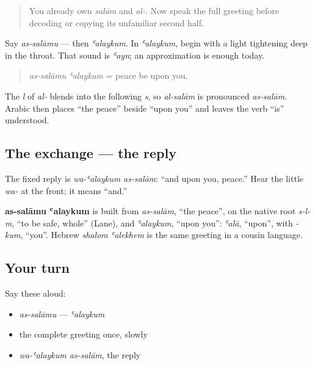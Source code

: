 \label{lesson:AR-C01-as-salamu-alaykum}



\begin{quote}
You already own \emph{salām} and \emph{al-}. Now speak the full greeting before decoding or copying its unfamiliar second half.
\end{quote}

\begin{sounds}
Say \emph{as-salāmu} — then \emph{ʿalaykum}. In \emph{ʿalaykum}, begin with a light tightening deep in the throat. That sound is \emph{ʿayn}; an approximation is enough today.

\begin{quote}
\emph{as-salāmu ʿalaykum} = peace be upon you.
\end{quote}

The \emph{l} of \emph{al-} blends into the following \emph{s}, so \emph{al-salām} is pronounced \emph{as-salām}. Arabic then places “the peace” beside “upon you” and leaves the verb “is” understood.
\end{sounds}

\subsection*{The exchange — the reply}
The fixed reply is \emph{wa-ʿalaykum as-salām}: “and upon you, peace.” Hear the little \emph{wa-} at the front; it means “and.”

\begin{cousinweb}
\textbf{as-salāmu ʿalaykum} is built from \emph{as-salām}, \textquotedblleft{}the peace\textquotedblright{}, on the native root \emph{s-l-m}, \textquotedblleft{}to be safe, whole\textquotedblright{} (Lane), and \emph{ʿalaykum}, \textquotedblleft{}upon you\textquotedblright{}: \emph{ʿalā}, \textquotedblleft{}upon\textquotedblright{}, with \emph{-kum}, \textquotedblleft{}you\textquotedblright{}. Hebrew \emph{shalom ʿalekhem} is the same greeting in a cousin language.
\end{cousinweb}

\subsection*{Your turn}
Say these aloud:

\begin{itemize}
\raggedright
  \item \emph{as-salāmu} — \emph{ʿalaykum}
  \item the complete greeting once, slowly
  \item \emph{wa-ʿalaykum as-salām}, the reply
\end{itemize}

